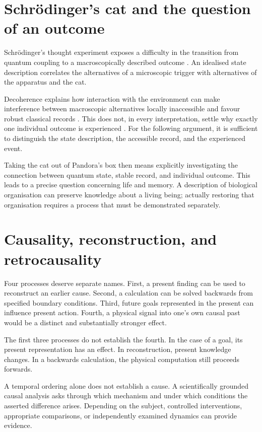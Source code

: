 \section{Schrödinger's cat and the question of an outcome}\label{en:sec9}
Schrödinger's thought experiment exposes a difficulty in the transition from quantum coupling to a macroscopically described outcome \cite{4}. An idealised state description correlates the alternatives of a microscopic trigger with alternatives of the apparatus and the cat.

Decoherence explains how interaction with the environment can make interference between macroscopic alternatives locally inaccessible and favour robust classical records \cite{5}. This does not, in every interpretation, settle why exactly one individual outcome is experienced \cite{16}. For the following argument, it is sufficient to distinguish the state description, the accessible record, and the experienced event.

Taking the cat out of Pandora's box then means explicitly investigating the connection between quantum state, stable record, and individual outcome. This leads to a precise question concerning life and memory. A description of biological organisation can preserve knowledge about a living being; actually restoring that organisation requires a process that must be demonstrated separately.

\section{Causality, reconstruction, and retrocausality}\label{en:sec10}
Four processes deserve separate names. First, a present finding can be used to reconstruct an earlier cause. Second, a calculation can be solved backwards from specified boundary conditions. Third, future goals represented in the present can influence present action. Fourth, a physical signal into one's own causal past would be a distinct and substantially stronger effect.

The first three processes do not establish the fourth. In the case of a goal, its present representation has an effect. In reconstruction, present knowledge changes. In a backwards calculation, the physical computation still proceeds forwards.

A temporal ordering alone does not establish a cause. A scientifically grounded causal analysis asks through which mechanism and under which conditions the asserted difference arises. Depending on the subject, controlled interventions, appropriate comparisons, or independently examined dynamics can provide evidence.

